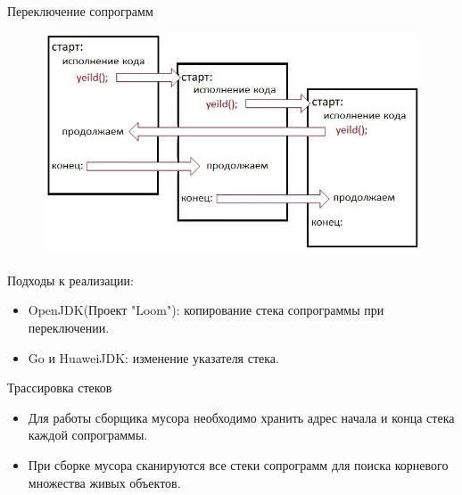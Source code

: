 \begin{frame}{Переключение сопрограмм}
	\begin{figure}
		\includegraphics[scale=0.5]{images/scheme.jpg}
	\end{figure}
	\par
	Подходы к реализации:
	\begin{itemize}
		\item OpenJDK(Проект "Loom"): копирование стека сопрограммы при переключении.
		\item Go и HuaweiJDK: изменение указателя стека.
	\end{itemize}
\end{frame}

\begin{frame}{Трассировка стеков}

	\begin{itemize}
		\item Для работы сборщика мусора необходимо хранить адрес начала и конца стека каждой сопрограммы.
		\item При сборке мусора сканируются все стеки сопрограмм для поиска корневого множества живых объектов.
	\end{itemize}
\end{frame}	

